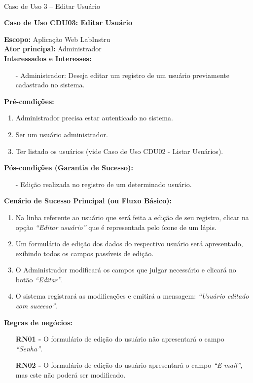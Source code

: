 \ \ \newline
\begin{quadro}[h!]\caption{Caso de Uso 3 -- Editar Usuário}
\hfill
\end{quadro}
	\begin{mdframed}
		\textbf{Caso de Uso CDU03: Editar Usuário}\\
		\begin{flushleft}
		\textbf{Escopo:} Aplicação Web LabInstru\\
		\textbf{Ator principal:} Administrador\\
		\textbf{Interessados e Interesses:}
		\begin{itemize}
			\item[-] Administrador: Deseja editar um registro de um usuário previamente cadastrado no sistema.
		\end{itemize}
		\textbf{Pré-condições:}\\
			 \begin{enumerate}
			 	\item{Administrador precisa estar autenticado no sistema.}
			 	\item{Ser um usuário administrador.}
			 	\item{Ter listado os usuários (vide Caso de Uso CDU02 - Listar Usuários).}
			 \end{enumerate}
		\textbf{Pós-condições (Garantia de Sucesso):}
		\begin{itemize}
			\item[-] Edição realizada no registro de um determinado usuário.
		\end{itemize}

		\textbf{Cenário de Sucesso Principal (ou Fluxo Básico):}\\
			\begin{enumerate}
				\item{Na linha referente ao usuário que será feita a edição de seu registro, clicar na opção \textit{``Editar usuário''} que é representada pelo ícone  de um lápis.}
				\item{Um formulário de edição dos dados do respectivo usuário será apresentado, exibindo todos os campos passíveis de edição. }
				\item{O Administrador modificará os campos que julgar necessário e clicará no botão \textit{``Editar''}.}
				\item{O sistema registrará as modificações e emitirá a mensagem: \textit{``Usuário editado com suceeso''}.}
			 \end{enumerate}

			 \textbf{Regras de negócios:}
		\begin{itemize}
			\item[] \textbf{RN01 - } O formulário de edição do usuário não apresentará o campo \textit{``Senha''}.
			\item[] \textbf{RN02 - } O formulário de edição do usuário apresentará o campo \textit{``E-mail''}, mas este não poderá ser modificado.
		\end{itemize}

		\end{flushleft}

	\end{mdframed}

